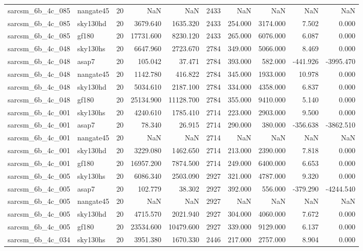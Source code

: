 \begin{longtable}{llrrrrrrrr}
sarcsm\_6b\_4c\_085 & nangate45 & 20 & NaN & NaN & 2433 & NaN & NaN & NaN & NaN \\
sarcsm\_6b\_4c\_085 & sky130hd & 20 & 3679.640 & 1635.320 & 2433 & 254.000 & 3174.000 & 7.502 & 0.000 \\
sarcsm\_6b\_4c\_085 & gf180 & 20 & 17731.600 & 8230.120 & 2433 & 265.000 & 6076.000 & 6.087 & 0.000 \\
sarcsm\_6b\_4c\_048 & sky130hs & 20 & 6647.960 & 2723.670 & 2784 & 349.000 & 5066.000 & 8.469 & 0.000 \\
sarcsm\_6b\_4c\_048 & asap7 & 20 & 105.042 & 37.471 & 2784 & 393.000 & 582.000 & -441.926 & -3995.470 \\
sarcsm\_6b\_4c\_048 & nangate45 & 20 & 1142.780 & 416.822 & 2784 & 345.000 & 1933.000 & 10.978 & 0.000 \\
sarcsm\_6b\_4c\_048 & sky130hd & 20 & 5034.610 & 2187.100 & 2784 & 334.000 & 4358.000 & 6.837 & 0.000 \\
sarcsm\_6b\_4c\_048 & gf180 & 20 & 25134.900 & 11128.700 & 2784 & 355.000 & 9410.000 & 5.140 & 0.000 \\
sarcsm\_6b\_4c\_001 & sky130hs & 20 & 4240.610 & 1785.410 & 2714 & 223.000 & 2903.000 & 9.500 & 0.000 \\
sarcsm\_6b\_4c\_001 & asap7 & 20 & 78.340 & 26.915 & 2714 & 290.000 & 380.000 & -356.638 & -3862.510 \\
sarcsm\_6b\_4c\_001 & nangate45 & 20 & NaN & NaN & 2714 & NaN & NaN & NaN & NaN \\
sarcsm\_6b\_4c\_001 & sky130hd & 20 & 3229.080 & 1462.650 & 2714 & 213.000 & 2390.000 & 7.818 & 0.000 \\
sarcsm\_6b\_4c\_001 & gf180 & 20 & 16957.200 & 7874.500 & 2714 & 249.000 & 6400.000 & 6.653 & 0.000 \\
sarcsm\_6b\_4c\_005 & sky130hs & 20 & 6086.340 & 2503.090 & 2927 & 321.000 & 4787.000 & 9.320 & 0.000 \\
sarcsm\_6b\_4c\_005 & asap7 & 20 & 102.779 & 38.302 & 2927 & 392.000 & 556.000 & -379.290 & -4244.540 \\
sarcsm\_6b\_4c\_005 & nangate45 & 20 & NaN & NaN & 2927 & NaN & NaN & NaN & NaN \\
sarcsm\_6b\_4c\_005 & sky130hd & 20 & 4715.570 & 2021.940 & 2927 & 304.000 & 4060.000 & 7.672 & 0.000 \\
sarcsm\_6b\_4c\_005 & gf180 & 20 & 23534.600 & 10479.600 & 2927 & 339.000 & 9129.000 & 6.137 & 0.000 \\
sarcsm\_6b\_4c\_034 & sky130hs & 20 & 3951.380 & 1670.330 & 2446 & 217.000 & 2757.000 & 8.904 & 0.000 \\

\end{longtable}
